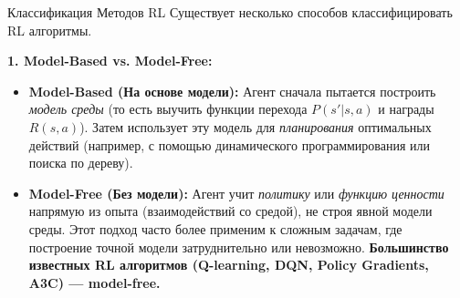 \begin{myblock}{Классификация Методов RL}
    Существует несколько способов классифицировать RL алгоритмы.

    \textbf{1. Model-Based vs. Model-Free:}
    \begin{itemize}
        \item \textbf{Model-Based (На основе модели):} Агент сначала пытается построить \textit{модель среды} (то есть выучить функции перехода $P(s'|s,a)$ и награды $R(s,a)$). Затем использует эту модель для \textit{планирования} оптимальных действий (например, с помощью динамического программирования или поиска по дереву).
        \item \textbf{Model-Free (Без модели):} Агент учит \textit{политику} или \textit{функцию ценности} напрямую из опыта (взаимодействий со средой), не строя явной модели среды. Этот подход часто более применим к сложным задачам, где построение точной модели затруднительно или невозможно. \textbf{Большинство известных RL алгоритмов (Q-learning, DQN, Policy Gradients, A3C) — model-free.}
    \end{itemize}


\end{myblock}
